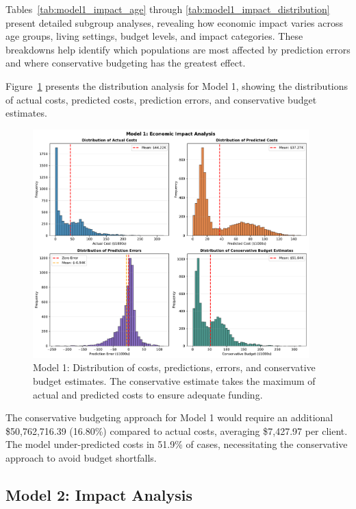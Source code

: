 Tables~\ref{tab:model1_impact_age} through \ref{tab:model1_impact_distribution} present detailed subgroup analyses, revealing how economic impact varies across age groups, living settings, budget levels, and impact categories. These breakdowns help identify which populations are most affected by prediction errors and where conservative budgeting has the greatest effect.

Figure~\ref{fig:model1_impact_histograms} presents the distribution analysis for Model 1, showing the distributions of actual costs, predicted costs, prediction errors, and conservative budget estimates.

\begin{figure}[htbp]
\centering
\includegraphics[width=0.95\textwidth]{figures/model_1_Impact_Histograms.pdf}
\caption{Model 1: Distribution of costs, predictions, errors, and conservative budget estimates. The conservative estimate takes the maximum of actual and predicted costs to ensure adequate funding.}
\label{fig:model1_impact_histograms}
\end{figure}

The conservative budgeting approach for Model 1 would require an additional \$50,762,716.39 (16.80\%) compared to actual costs, averaging \$7,427.97 per client. The model under-predicted costs in 51.9\% of cases, necessitating the conservative approach to avoid budget shortfalls. 

\clearpage

\subsection{Model 2: Impact Analysis}
\label{subsec:model2_impact}


